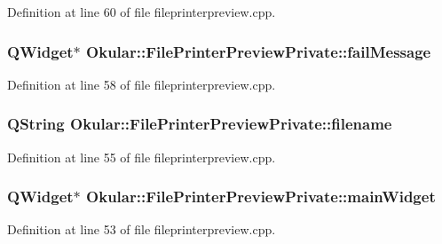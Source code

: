 Definition at line 60 of file fileprinterpreview.\+cpp.

\hypertarget{classOkular_1_1FilePrinterPreviewPrivate_ab0fea736743388ea1d4b80415dee459c}{
\subsubsection[{fail\+Message}]{\setlength{\rightskip}{0pt plus 5cm}Q\+Widget$\ast$ Okular\+::\+File\+Printer\+Preview\+Private\+::fail\+Message}}\label{classOkular_1_1FilePrinterPreviewPrivate_ab0fea736743388ea1d4b80415dee459c}


Definition at line 58 of file fileprinterpreview.\+cpp.

\hypertarget{classOkular_1_1FilePrinterPreviewPrivate_abcf91fd67cbf07a71e6abb5c94b2e946}{
\subsubsection[{filename}]{\setlength{\rightskip}{0pt plus 5cm}Q\+String Okular\+::\+File\+Printer\+Preview\+Private\+::filename}}\label{classOkular_1_1FilePrinterPreviewPrivate_abcf91fd67cbf07a71e6abb5c94b2e946}


Definition at line 55 of file fileprinterpreview.\+cpp.

\hypertarget{classOkular_1_1FilePrinterPreviewPrivate_acfd3457414768ef0f6e48a4cb96f21cb}{
\subsubsection[{main\+Widget}]{\setlength{\rightskip}{0pt plus 5cm}Q\+Widget$\ast$ Okular\+::\+File\+Printer\+Preview\+Private\+::main\+Widget}}\label{classOkular_1_1FilePrinterPreviewPrivate_acfd3457414768ef0f6e48a4cb96f21cb}


Definition at line 53 of file fileprinterpreview.\+cpp.

